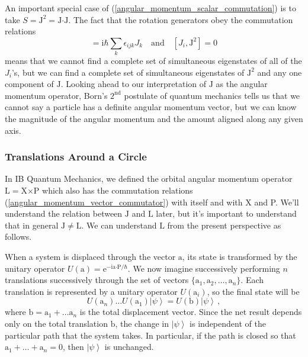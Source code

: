 \documentclass{article}
\theoremstyle{plain}\theoremheaderfont{\normalfont\itshape}\theorembodyfont{\rmfamily}\theoremseparator{.}\newtheorem*{rem}{Remark}\newtheorem*{ex}{Example}\newtheorem*{proof}{Proof}\newtheorem*{altp}{Alternative proof}
\theoremstyle{plain}\theoremheaderfont{\normalfont\bfseries}\theorembodyfont{\rmfamily}\theoremseparator{.}\newtheorem{thm}{Theorem}[section]\newtheorem{lem}[thm]{Lemma}\newtheorem{prop}[thm]{Proposition}\newtheorem*{cor}{Corollary}\newtheorem{defn}[thm]{Definition}\newtheorem{clm}[thm]{Claim}\newtheorem{clminproof}{Claim}
\theoremstyle{break}\theoremheaderfont{\normalfont\itshape}\theorembodyfont{\rmfamily}\theoremseparator{.\medskip}\newtheorem*{proofskip}{Proof}\newtheorem*{exs}{Examples}\newtheorem*{rems}{Remarks}
\theoremstyle{break}\theoremheaderfont{\normalfont\bfseries}\theorembodyfont{\rmfamily}\theoremseparator{.\medskip}\newtheorem{lemskip}[thm]{Lemma}\newtheorem{defnskip}[thm]{Definition}\newtheorem{propskip}[thm]{Proposition}\newtheorem{thmskip}[thm]{Theorem}
\numberwithin{equation}{section}
\newcommand{\ii}{\mathrm{i}}
\newcommand{\ee}{\mathrm{e}}
\newcommand{\ket}[1]{\left| #1 \right\rangle}
\newcommand{\vb}[1]{\bm{\mathrm{#1}}}
\newcommand{\cross}{\bm{\times}}
\newcommand{\vdot}{\bm{\cdot}}
\begin{document}
    An important special case of (\ref{angular_momentum_scalar_commutation}) is to take \(S=\vb{J}^2=\vb{J}\vdot\vb{J}\). The fact that the rotation generators obey the commutation relations
    \begin{equation}
        [J_i,J_j]=\ii\hbar\sum_k\epsilon_{ijk}J_k\quad\text{and}\quad[J_i,\vb{J}^2]=0
    \end{equation}
    means that we cannot find a complete set of simultaneous eigenstates of all of the \(J_i\)'s, but we can find a complete set of simultaneous eigenstates of \(\vb{J}^2\) and any one component of \(\vb{J}\). Looking ahead to our interpretation of \(\vb{J}\) as the angular momentum operator, Born's \(2^{\text{nd}}\) postulate of quantum mechanics tells us that we cannot say a particle has a definite angular momentum vector, but we can know the magnitude of the angular momentum and the amount aligned along any given axis.

    \subsubsection{Translations Around a Circle}
    In IB Quantum Mechanics, we defined the orbital angular momentum operator \(\vb{L}=\vb{X}\cross\vb{P}\) which also has the commutation relations (\ref{angular_momentum_vector_commutator}) with itself and with X and P. We'll understand the relation between \(\vb{J}\) and \(\vb{L}\) later, but it's important to understand that in general \(\vb{J}\ne\vb{L}\). We can understand \(\vb{L}\) from the present perspective as follows.

    When a system is displaced through the vector \(\vb{a}\), its state is transformed by the unitary operator \(U(\vb{a})=\ee^{-\ii \vb{a}\vdot\vb{P}/\hbar}\). We now imagine successively performing \(n\) translations successively through the set of vectors \(\{\vb{a}_1,\vb{a}_2,\dots,\vb{a}_n\}\). Each translation is represented by a unitary operator \(U(\vb{a}_i)\), so the final state will be
    \begin{equation}
        U(\vb{a}_n)\dots U(\vb{a}_1)\ket{\psi}=U(\vb{b})\ket{\psi}\,,
    \end{equation}
    where \(\vb{b}=\vb{a}_1+\dots\vb{a}_n\) is the total displacement vector. Since the net result depends only on the total translation \(\vb{b}\), the change in \(\ket{\psi}\) is independent of the particular path that the system takes. In particular, if the path is closed so that \(\vb{a}_1+\dots+\vb{a}_n=\vb{0}\), then \(\ket{\psi}\) is unchanged.
\end{document}
